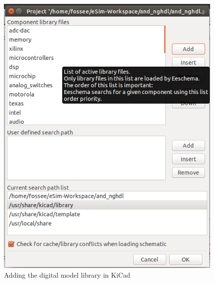 \begin{enumerate}
        \begin{figure}[!htp]
            \centering
            \includegraphics[width =\smfig]{./NGHDL/screen6.png}
            \caption{Adding the digital model library in KiCad}
            \label{screen6}
        \end{figure}



\end{enumerate}
